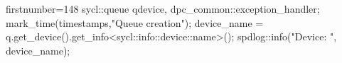 \begin{cppcode*}{firstnumber=148}
        sycl::queue q{device, dpc_common::exception_handler};
        mark_time(timestamps,"Queue creation");
        device_name = q.get_device().get_info<sycl::info::device::name>();
        spdlog::info("Device: {}", device_name);
\end{cppcode*}
